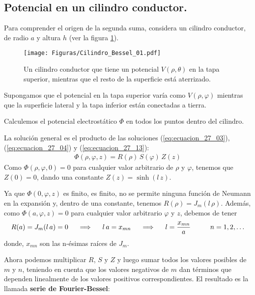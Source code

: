 \documentclass[12pt]{article}
\numberwithin{equation}{section}
\begin{document}
\subsection{Potencial en un cilindro conductor.}

Para comprender el origen de la segunda suma, considera un cilindro conductor, de radio $a$ y altura $h$ (ver la figura \ref{fig:figura_27_01}).
\begin{figure}[H]
    \centering
    \texttt{[image: Figuras/Cilindro\_Bessel\_01.pdf]}
    \caption{Un cilindro conductor que tiene un potencial $V (\rho, \theta)$ en la tapa superior, mientras que el resto de la superficie está aterrizado.}
    \label{fig:figura_27_01}
\end{figure}
Supongamos que el potencial en la tapa superior varía como $V (\rho, \varphi)$ mientras que la superficie lateral y la tapa inferior están conectadas a tierra.
\par
Calculemos el potencial electrostático $\Phi$ en todos los puntos dentro del cilindro.
\par
La solución general es el producto de las soluciones (\ref{eq:ecuacion_27_03}), (\ref{eq:ecuacion_27_04}) y (\ref{eq:ecuacion_27_13}):
\begin{align*}
\Phi (\rho, \varphi, z) = R (\rho) \, S (\varphi) \, Z (z)
\end{align*}
Como $\Phi (\rho, \varphi, 0) = 0$ para cualquier valor arbitrario de $\rho$ y $\varphi$, tenemos que $Z (0) = 0$, dando una constante $Z(z) = \sinh (l \, z)$.
\par
Ya que $\Phi (0, \varphi, z)$ es finito, es finito, no se permite ninguna función de Neumann en la expansión y, dentro de una constante, tenemos $R (\rho) = J_{m}(l \, \rho)$. Además, como $\Phi (a, \varphi, z) = 0$ para cualquier valor arbitrario $\varphi$ y $z$, debemos de tener
\begin{align*}
R (a) = J_{m} (l \, a) = 0 \hspace{0.5cm} \Longrightarrow \hspace{0.5cm} l \, a = x_{mn} \hspace{0.5cm} \Longrightarrow \hspace{0.5cm} l = \dfrac{x_{mn}}{a} \hspace{1cm} n = 1, 2, \ldots
\end{align*}
donde, $x_{mn}$ son las n-ésimas raíces de $J_{m}$.
\par
Ahora podemos multiplicar $R$, $S$ y $Z$ y luego sumar todos los valores posibles de $m$ y $n$, teniendo en cuenta que los valores negativos de $m$ dan términos que dependen linealmente de los valores positivos correspondientes. El resultado es la llamada \textbf{serie de Fourier-Bessel}:
\end{document}
